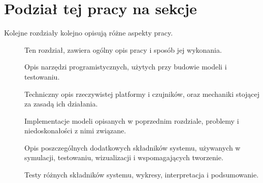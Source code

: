 \section{Podział tej pracy na sekcje}
	Kolejne rozdziały kolejno opisują różne aspekty pracy.
	\begin{description}
		\item[] Ten rozdział, zawiera ogólny opis pracy i sposób jej wykonania.
		\item[] Opis narzędzi programistycznych, użytych przy budowie modeli i testowaniu.
		\item[] Techniczny opis rzeczywistej platformy i czujników, oraz mechaniki stojącej za zasadą ich działania.
		\item[] Implementacje modeli opisanych w poprzednim rozdziale, problemy i niedoskonałości z nimi związane.
		\item[] Opis poszczególnych dodatkowych składników systemu, używanych w symulacji, testowaniu, wizualizacji i wspomagających tworzenie.
		\item[] Testy różnych składników systemu, wykresy, interpretacja i podsumowanie.
	\end{description}
